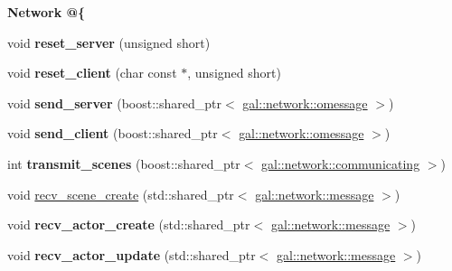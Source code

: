 \begin{Indent}{\bf \-Network @\{}\par
\begin{DoxyCompactItemize}
\item 
\hypertarget{classNeb_1_1app_a88525d86c44907e36e534ffb5d8c9f04}{void {\bfseries reset\-\_\-server} (unsigned short)}\label{classNeb_1_1app_a88525d86c44907e36e534ffb5d8c9f04}

\item 
\hypertarget{classNeb_1_1app_a94908472755f4f20846a75a5368825cb}{void {\bfseries reset\-\_\-client} (char const $\ast$, unsigned short)}\label{classNeb_1_1app_a94908472755f4f20846a75a5368825cb}

\item 
\hypertarget{classNeb_1_1app_a851a1aac45ad8ae23d4b1e7328ad328a}{void {\bfseries send\-\_\-server} (boost\-::shared\-\_\-ptr$<$ \hyperlink{classgal_1_1network_1_1omessage}{gal\-::network\-::omessage} $>$)}\label{classNeb_1_1app_a851a1aac45ad8ae23d4b1e7328ad328a}

\item 
\hypertarget{classNeb_1_1app_a74d06a6804ae94e53025b770600bdc83}{void {\bfseries send\-\_\-client} (boost\-::shared\-\_\-ptr$<$ \hyperlink{classgal_1_1network_1_1omessage}{gal\-::network\-::omessage} $>$)}\label{classNeb_1_1app_a74d06a6804ae94e53025b770600bdc83}

\item 
\hypertarget{classNeb_1_1app_a72ee12a8337acc834d944d59917eaf16}{int {\bfseries transmit\-\_\-scenes} (boost\-::shared\-\_\-ptr$<$ \hyperlink{classgal_1_1network_1_1communicating}{gal\-::network\-::communicating} $>$)}\label{classNeb_1_1app_a72ee12a8337acc834d944d59917eaf16}

\item 
void \hyperlink{classNeb_1_1app_acefbc3bb3de71f3c8cca0afc1fada857}{recv\-\_\-scene\-\_\-create} (std\-::shared\-\_\-ptr$<$ \hyperlink{classgal_1_1network_1_1message}{gal\-::network\-::message} $>$)
\item 
\hypertarget{classNeb_1_1app_a454da3e291e16b2d0982099e5277c81b}{void {\bfseries recv\-\_\-actor\-\_\-create} (std\-::shared\-\_\-ptr$<$ \hyperlink{classgal_1_1network_1_1message}{gal\-::network\-::message} $>$)}\label{classNeb_1_1app_a454da3e291e16b2d0982099e5277c81b}

\item 
\hypertarget{classNeb_1_1app_a6b727dbcc2fd814a3513678424c88496}{void {\bfseries recv\-\_\-actor\-\_\-update} (std\-::shared\-\_\-ptr$<$ \hyperlink{classgal_1_1network_1_1message}{gal\-::network\-::message} $>$)}\label{classNeb_1_1app_a6b727dbcc2fd814a3513678424c88496}


\end{DoxyCompactItemize}
\end{Indent}

